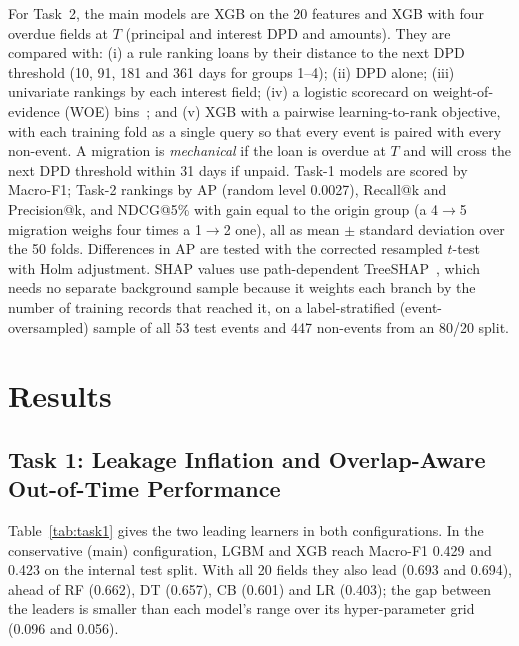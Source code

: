 \documentclass[runningheads]{llncs}
\begin{document}
For Task~2, the main models are XGB on the 20 features and XGB with four overdue fields at $T$ (principal and interest DPD and amounts). They are compared with: (i) a rule ranking loans by their distance to the next DPD threshold (10, 91, 181 and 361 days for groups 1--4); (ii) DPD alone; (iii) univariate rankings by each interest field; (iv) a logistic scorecard on weight-of-evidence (WOE) bins~\cite{siddiqi2006credit}; and (v) XGB with a pairwise learning-to-rank objective, with each training fold as a single query so that every event is paired with every non-event. A migration is \emph{mechanical} if the loan is overdue at $T$ and will cross the next DPD threshold within 31 days if unpaid. Task-1 models are scored by Macro-F1; Task-2 rankings by AP (random level 0.0027), Recall@k and Precision@k, and NDCG@5\% with gain equal to the origin group (a 4$\to$5 migration weighs four times a 1$\to$2 one), all as mean $\pm$ standard deviation over the 50 folds. Differences in AP are tested with the corrected resampled $t$-test~\cite{nadeau2003inference} with Holm adjustment. SHAP values use path-dependent TreeSHAP~\cite{lundberg2020tree}, which needs no separate background sample because it weights each branch by the number of training records that reached it, on a label-stratified (event-oversampled) sample of all 53 test events and 447 non-events from an 80/20 split.

\section{Results}
\label{sec:results}

\subsection{Task 1: Leakage Inflation and Overlap-Aware Out-of-Time Performance}

Table~\ref{tab:task1} gives the two leading learners in both configurations. In the conservative (main) configuration, LGBM and XGB reach Macro-F1 0.429 and 0.423 on the internal test split. With all 20 fields they also lead (0.693 and 0.694), ahead of RF (0.662), DT (0.657), CB (0.601) and LR (0.403); the gap between the leaders is smaller than each model's range over its hyper-parameter grid (0.096 and 0.056).
\end{document}
